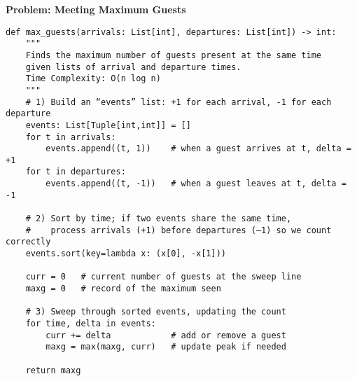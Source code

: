 \noindent\textbf{Problem: Meeting Maximum Guests}
\begin{verbatim}
def max_guests(arrivals: List[int], departures: List[int]) -> int:
    """
    Finds the maximum number of guests present at the same time
    given lists of arrival and departure times.
    Time Complexity: O(n log n)
    """
    # 1) Build an “events” list: +1 for each arrival, -1 for each departure
    events: List[Tuple[int,int]] = []
    for t in arrivals:
        events.append((t, 1))    # when a guest arrives at t, delta = +1
    for t in departures:
        events.append((t, -1))   # when a guest leaves at t, delta = -1

    # 2) Sort by time; if two events share the same time,
    #    process arrivals (+1) before departures (–1) so we count correctly
    events.sort(key=lambda x: (x[0], -x[1]))

    curr = 0   # current number of guests at the sweep line
    maxg = 0   # record of the maximum seen

    # 3) Sweep through sorted events, updating the count
    for time, delta in events:
        curr += delta            # add or remove a guest
        maxg = max(maxg, curr)   # update peak if needed

    return maxg
\end{verbatim}
% 
